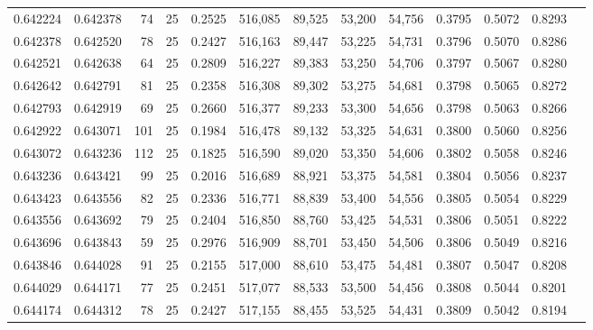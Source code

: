 \begin{tabular}{rrrrrrrrrrrrr}
0.642224 & 0.642378 &    74 &  25 &                                     0.2525 & 516,085 &  89,525 &  53,200 &  54,756 & 0.3795 & 0.5072 & 0.8293 \\
0.642378 & 0.642520 &    78 &  25 &                                     0.2427 & 516,163 &  89,447 &  53,225 &  54,731 & 0.3796 & 0.5070 & 0.8286 \\
0.642521 & 0.642638 &    64 &  25 &                                     0.2809 & 516,227 &  89,383 &  53,250 &  54,706 & 0.3797 & 0.5067 & 0.8280 \\
0.642642 & 0.642791 &    81 &  25 &                                     0.2358 & 516,308 &  89,302 &  53,275 &  54,681 & 0.3798 & 0.5065 & 0.8272 \\
0.642793 & 0.642919 &    69 &  25 &                                     0.2660 & 516,377 &  89,233 &  53,300 &  54,656 & 0.3798 & 0.5063 & 0.8266 \\
0.642922 & 0.643071 &   101 &  25 &                                     0.1984 & 516,478 &  89,132 &  53,325 &  54,631 & 0.3800 & 0.5060 & 0.8256 \\
0.643072 & 0.643236 &   112 &  25 &                                     0.1825 & 516,590 &  89,020 &  53,350 &  54,606 & 0.3802 & 0.5058 & 0.8246 \\
0.643236 & 0.643421 &    99 &  25 &                                     0.2016 & 516,689 &  88,921 &  53,375 &  54,581 & 0.3804 & 0.5056 & 0.8237 \\
0.643423 & 0.643556 &    82 &  25 &                                     0.2336 & 516,771 &  88,839 &  53,400 &  54,556 & 0.3805 & 0.5054 & 0.8229 \\
0.643556 & 0.643692 &    79 &  25 &                                     0.2404 & 516,850 &  88,760 &  53,425 &  54,531 & 0.3806 & 0.5051 & 0.8222 \\
0.643696 & 0.643843 &    59 &  25 &                                     0.2976 & 516,909 &  88,701 &  53,450 &  54,506 & 0.3806 & 0.5049 & 0.8216 \\
0.643846 & 0.644028 &    91 &  25 &                                     0.2155 & 517,000 &  88,610 &  53,475 &  54,481 & 0.3807 & 0.5047 & 0.8208 \\
0.644029 & 0.644171 &    77 &  25 &                                     0.2451 & 517,077 &  88,533 &  53,500 &  54,456 & 0.3808 & 0.5044 & 0.8201 \\
0.644174 & 0.644312 &    78 &  25 &                                     0.2427 & 517,155 &  88,455 &  53,525 &  54,431 & 0.3809 & 0.5042 & 0.8194 \\

\end{tabular}
